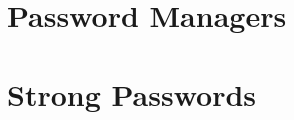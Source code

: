 \documentclass[10pt,oneside,english,a4paper]{article}
\begin{document}

\clearpage
\section{Password Managers}

\section{Strong Passwords}




\clearpage


\nocite{*}
\end{document}
